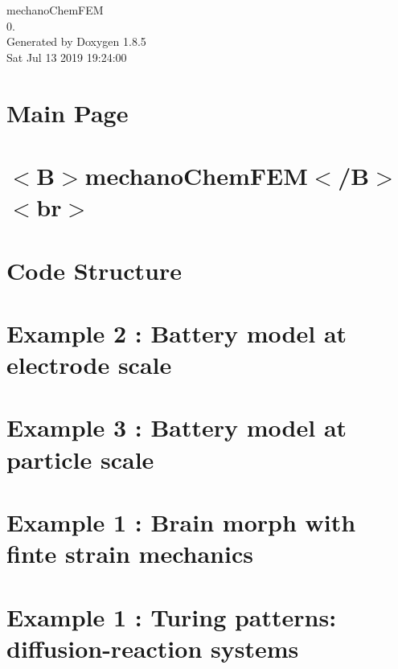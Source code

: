 \documentclass[twoside]{book}
\newcommand{\clearemptydoublepage}{%
  \newpage{\pagestyle{empty}\cleardoublepage}%
}
\begin{document}
\begin{titlepage}
\vspace*{7cm}
\begin{center}%
{\Large mechano\-Chem\-F\-E\-M \\[1ex]\large 0. }\\
\vspace*{1cm}
{\large Generated by Doxygen 1.8.5}\\
\vspace*{0.5cm}
{\small Sat Jul 13 2019 19:24:00}\\
\end{center}
\end{titlepage}
\clearemptydoublepage
\tableofcontents
\clearemptydoublepage
{}

\chapter{Main Page}
\label{index}\hypertarget{index}{}
\chapter{$<$B$>$mechano\-Chem\-F\-E\-M$<$/\-B$>$$<$br$>$}
\label{md_doxygen_readme}

\chapter{Code Structure}
\label{codestructure}

\chapter{Example 2 \-: Battery model at electrode scale}
\label{battery_electrode_scale}

\chapter{Example 3 \-: Battery model at particle scale}
\label{battery_particle}

\chapter{Example 1 \-: Brain morph with finte strain mechanics}
\label{brain_morph}

\chapter{Example 1 \-: Turing patterns\-: diffusion-\/reaction systems}
\label{diffusion_reaction}

\end{document}
